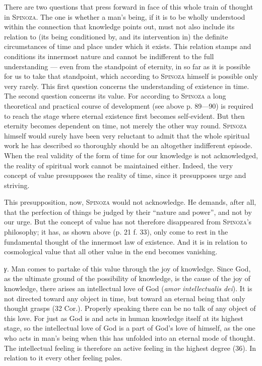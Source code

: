 \documentclass[12pt]{article}
\begin{document}
There are two questions that press forward in face of this whole train of thought in
\textsc{Spinoza}. The one is whether a man's being, if it is to be wholly understood within the
connection that knowledge points out, must not also include its relation to (its being conditioned
by, and its intervention in) the definite circumstances of time and place under which it exists.
This relation stamps and conditions its innermost nature and cannot be indifferent to the full
understanding --- even from the standpoint of eternity, in so far as it is possible for us to take
that standpoint, which according to \textsc{Spinoza} himself is possible only very rarely. This
first question concerns the understanding of existence in time. The second question concerns its
value. For according to \textsc{Spinoza} a long theoretical and practical course of development
(see above p. 89---90) is required to reach the stage where eternal existence first becomes
self-evident. But then eternity becomes dependent on time, not merely the other way round.
\textsc{Spinoza} himself would surely have been very reluctant to admit that the whole spiritual
work he has described so thoroughly should be an altogether indifferent episode. When the real
validity of the form of time for our knowledge is not acknowledged, the reality of spiritual work
cannot be maintained either. Indeed, the very concept of value presupposes the reality of time,
since it presupposes urge and striving.

This presupposition, now, \textsc{Spinoza} would not acknowledge. He demands, after all, that the
perfection of things be judged by their ``nature and power'', and not by our urge. But the concept
of value has not therefore disappeared from \textsc{Spinoza}'s philosophy; it has, as shown above
(p. 21 f. 33), only come to rest in the fundamental thought of the innermost law of existence. And
it is in relation to cosmological value that all other value in the end becomes vanishing.

\textit{γ.} Man comes to partake of this value through the joy of knowledge. Since God, as the
ultimate ground of the possibility of knowledge, is the cause of the joy of knowledge, there arises
an intellectual love of God (\textit{amor intellectualis dei}). It is not directed toward any object
in time, but toward an eternal being that only thought grasps (32 Cor.). Properly speaking there
can be no talk of any object of this love. For just as God is and acts in human knowledge itself at
its highest stage, so the intellectual love of God is a part of God's love of himself, as the one
who acts in man's being when this has unfolded into an eternal mode of thought. The intellectual
feeling is therefore an active feeling in the highest degree (36). In relation to it every other
feeling pales.
\end{document}
